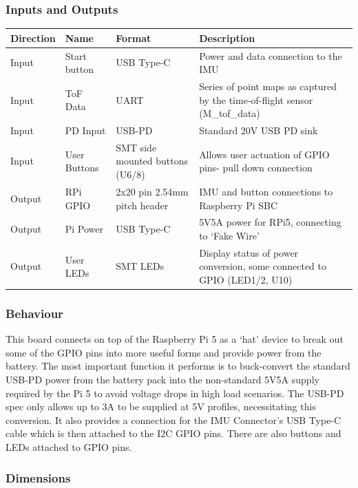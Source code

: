 \documentclass[11pt]{article}
\begin{document}
			\subsubsection{Inputs and Outputs}
			\begin{tabularx}{\textwidth}{X X X p{}}
				\toprule
				\textbf{Direction} & 	\textbf{Name} & 	\textbf{Format} & 	\textbf{Description} \\
				\midrule
				Input & Start button & USB Type-C & Power and data connection to the IMU \\
				Input & ToF Data & UART & Series of point maps as captured by the time-of-flight sensor (M\_tof\_data) \\
				Input & PD Input & USB-PD & Standard 20V USB PD sink \\
				Input & User Buttons  & SMT side mounted buttons (U6/8) & Allows user actuation of GPIO pins- pull down connection \\
				Output & RPi GPIO & 2x20 pin 2.54mm pitch header & IMU and button connections to Raspberry Pi SBC \\
				Output & Pi Power & USB Type-C & 5V5A power for RPi5, connecting to ‘Fake Wire’ \\
				Output & User LEDs & SMT LEDs & Display status of power conversion, some connected to GPIO (LED1/2, U10) \\
				\bottomrule
			\end{tabularx}



			\subsubsection{Behaviour}

This board connects on top of the Raspberry Pi 5 as a ‘hat’ device to break out some of the GPIO pins into more useful forms and provide power from the battery. The most important function it performs is to buck-convert the standard USB-PD power from the battery pack into the non-standard 5V5A supply required by the Pi 5 to avoid voltage drops in high load scenarios. The USB-PD spec only allows up to 3A to be supplied at 5V profiles, necessitating this conversion. It also provides a connection for the IMU Connector’s USB Type-C cable which is then attached to the I2C GPIO pins. There are also buttons and LEDs attached to GPIO pins. 

\subsubsection{Dimensions}
\end{document}
